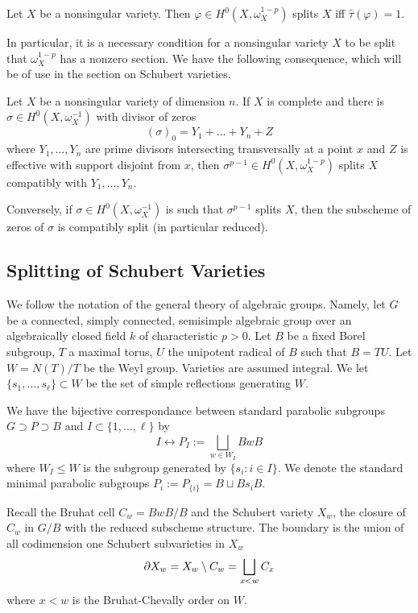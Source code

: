 \documentclass[12pt]{article}
\begin{document}
\begin{thm}\label{bkthm1.3.8}
    Let $X$ be a nonsingular variety. Then $\varphi \in H^0(X, \omega_X^{1-p})$ splits $X$ iff $\hat{\tau}(\varphi) = 1$.
\end{thm}
In particular, it is a necessary condition for a nonsingular variety $X$ to be split that $\omega_X^{1-p}$ has a nonzero section. We have the following consequence, which will be of use in the section on Schubert varieties.
\begin{prop}\label{bkprop1.3.11}
    Let $X$ be a nonsingular variety of dimension $n$. If $X$ is complete and there is $\sigma \in H^0(X, \omega_X^{-1})$ with divisor of zeros 
    \[(\sigma)_0 = Y_1 + \ldots + Y_n + Z\]
    where $Y_1,\ldots,Y_n$ are prime divisors intersecting transversally at a point $x$ and $Z$ is effective with support disjoint from $x$, then $\sigma^{p-1} \in H^0(X,\omega_X^{1-p})$ splits $X$ compatibly with $Y_1,\ldots,Y_n$.

    Conversely, if $\sigma \in H^0(X, \omega_X^{-1})$ is such that $\sigma^{p-1}$ splits $X$, then the subscheme of zeros of $\sigma$ is compatibly split (in particular reduced).
\end{prop}

\subsection{Splitting of Schubert Varieties}
We follow the notation of the general theory of algebraic groups. Namely, let $G$ be a connected, simply connected, semisimple algebraic group over an algebraically closed field $k$ of characteristic $p > 0$. Let $B$ be a fixed Borel subgroup, $T$ a maximal torus, $U$ the unipotent radical of $B$ such that $B = TU$. Let $W = N(T)/T$ be the Weyl group. Varieties are assumed integral. We let $\{s_1,\ldots,s_{\ell}\} \subset W$ be the set of simple reflections generating $W$.

We have the bijective correspondance between standard parabolic subgroups $G \supset P \supset B$ and $I \subset \{1,\ldots,\ell\}$ by
\[I \leftrightarrow P_I := \bigsqcup_{w \in W_I} BwB\]
where $W_I \leq W$ is the subgroup generated by $\{s_{i} \colon i \in I\}$. We denote the standard minimal parabolic subgroups $P_i := P_{\{i\}} = B \sqcup Bs_iB$.

Recall the Bruhat cell $C_w = BwB/B$ and the Schubert variety $X_w$, the closure of $C_w$ in $G/B$ with the reduced subscheme structure. The boundary is the union of all codimension one Schubert subvarieties in $X_w$
\[\partial X_w = X_w \setminus C_w = \bigsqcup_{x < w} C_x\]
where $x < w$ is the Bruhat-Chevally order on $W$.
\end{document}
